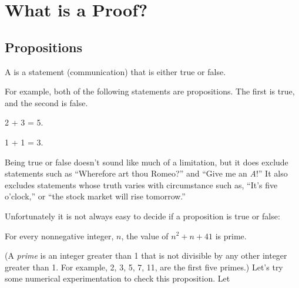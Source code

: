 \chapter{What is a Proof?}\label{proofs_chap}

\section{Propositions}\label{prop_sec}

\begin{definition*}
  A  is a statement (communication) that is either
  true or false.
\end{definition*}

For example, both of the following statements are propositions.  The
first is true, and the second is false.
\begin{proposition}
2 + 3 = 5.
\end{proposition}

\begin{proposition}
1 + 1 = 3.
\end{proposition}

Being true or false doesn't sound like much of a limitation, but it does
exclude statements such as ``Wherefore art thou Romeo?'' and ``Give me an
\emph{A}!''  It also excludes statements whose truth varies with
circumstance such as, ``It's five o'clock,'' or ``the stock market will
rise tomorrow.''

\iffalse
Being ``mathematical'' is a more serious restriction.  For example,
``Albert's wife's name is `Irene'~'' is a true statement, and you
could prove it by presenting legal documents and the testimony of
their children.  But it isn't a proposition because it is not a
\emph{mathematical} statement.  There is no mathematical definition of
Albert or Irene, and statements about them are not part of
mathematics.  Propositions must be about well-defined mathematical
objects like numbers, sets, functions, relations, \etc, and they must
be stated using mathematically precise language.  We can illustrate
this with a few examples.
\fi

Unfortunately it is not always easy to decide if a proposition is true
or false:
\begin{proposition}\label{41form}
For every nonnegative integer, $n$, the value of $n^2 + n + 41$ is prime.
\end{proposition}
(A \emph{prime}%
is an integer greater than 1 that is not divisible by
any other integer greater than 1.  For example, 2, 3, 5, 7, 11, are
the first five primes.)  Let's try some numerical experimentation to
check this proposition.  Let


